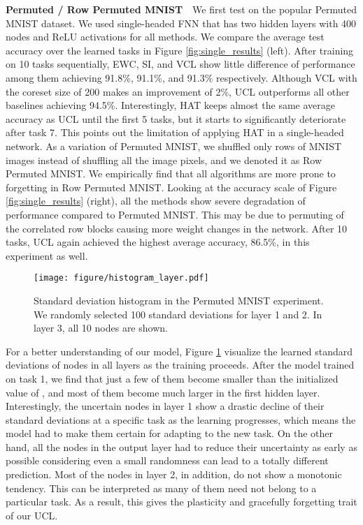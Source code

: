 \textbf{Permuted / Row Permuted MNIST}\ \ 
We first test on the popular Permuted MNIST dataset. We used single-headed FNN that has two hidden layers with 400 nodes and ReLU activations for all methods.
We compare the average test accuracy over the learned tasks in Figure \ref{fig:single_results} (left). After training on 10 tasks sequentially,  EWC, SI, and VCL show little difference of performance among them achieving 91.8\%, 91.1\%, and 91.3\% respectively. Although VCL with the coreset size of 200 makes an improvement of 2\%, UCL outperforms all other baselines achieving 94.5\%. Interestingly, HAT keeps almost the same average accuracy as UCL until the first 5 tasks, but it starts to significantly deteriorate after task 7. This points out the limitation of applying HAT in a single-headed network. As a variation of Permuted MNIST, we shuffled only rows of MNIST images instead of shuffling all the image pixels, and we denoted it as Row Permuted MNIST. 
We empirically find that all algorithms are more prone to forgetting in Row Permuted MNIST.  Looking at the accuracy scale of Figure \ref{fig:single_results} (right), all the methods show severe degradation of performance compared to Permuted MNIST. This may be due to  permuting of the correlated row blocks causing more weight changes in the network. After 10 tasks, UCL again achieved the highest average accuracy, 86.5\%, in this experiment as well.
\begin{figure}[h]
    \centering
    \texttt{[image: figure/histogram\_layer.pdf]}\vspace{-.07in}
    \caption{Standard deviation histogram in the Permuted MNIST experiment. We randomly selected 100 standard deviations for layer 1 and 2. In layer 3, all 10 nodes are shown.}\label{fig:histogram}
    \vspace{-.2in}
\end{figure}

 For a better understanding of our model, Figure \ref{fig:histogram} visualize the learned standard deviations of nodes in all layers as the training proceeds. 
After the model trained on task 1, 
we find that just a few of them become smaller than 
the initialized value of , and most of them become much larger in the first hidden layer. 
Interestingly, the uncertain nodes in layer 1 show a drastic decline of their standard deviations at a specific task as the learning progresses, which means the model had to make them certain for adapting to the new task. On the other hand, all the nodes in the output layer had to reduce their uncertainty as early as possible considering even a small randomness can lead to a totally different prediction. Most of the nodes in layer 2, in addition, do not show a monotonic tendency. This can be interpreted as many of them need not belong to a particular task. As a result, this gives the plasticity and gracefully forgetting trait of our UCL.



